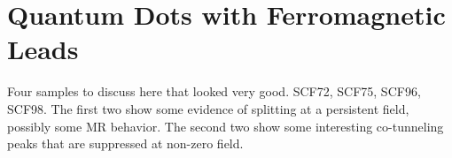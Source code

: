 \chapter{Quantum Dots with Ferromagnetic Leads}
\label{sec:FMCNTQD}


Four samples to discuss here that looked very good. SCF72, SCF75, SCF96, SCF98. The first two show some evidence of splitting at a persistent field, possibly some MR behavior. The second two show some interesting co-tunneling peaks that are suppressed at non-zero field.